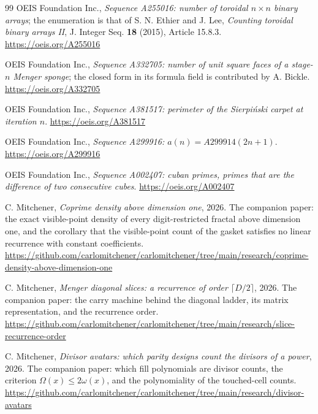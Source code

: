 \documentclass[11pt]{amsart}
\theoremstyle{definition}
\theoremstyle{remark}
\begin{document}
\begin{thebibliography}{99}
OEIS Foundation Inc., \emph{Sequence A255016: number of toroidal $n \times n$ binary arrays}; the enumeration is that of S. N. Ethier and J. Lee, \emph{Counting toroidal binary arrays II}, J. Integer Seq. \textbf{18} (2015), Article 15.8.3. \url{https://oeis.org/A255016}

OEIS Foundation Inc., \emph{Sequence A332705: number of unit square faces of a stage-$n$ Menger sponge}; the closed form in its formula field is contributed by A. Bickle. \url{https://oeis.org/A332705}

OEIS Foundation Inc., \emph{Sequence A381517: perimeter of the Sierpi\'nski carpet at iteration $n$}. \url{https://oeis.org/A381517}

OEIS Foundation Inc., \emph{Sequence A299916: $a(n) = A299914(2n+1)$}. \url{https://oeis.org/A299916}

OEIS Foundation Inc., \emph{Sequence A002407: cuban primes, primes that are the difference of two consecutive cubes}. \url{https://oeis.org/A002407}

C. Mitchener, \emph{Coprime density above dimension one}, 2026. The companion paper: the exact visible-point density of every digit-restricted fractal above dimension one, and the corollary that the visible-point count of the gasket satisfies no linear recurrence with constant coefficients. \url{https://github.com/carlomitchener/carlomitchener/tree/main/research/coprime-density-above-dimension-one}

C. Mitchener, \emph{Menger diagonal slices: a recurrence of order $\lceil D/2 \rceil$}, 2026. The companion paper: the carry machine behind the diagonal ladder, its matrix representation, and the recurrence order. \url{https://github.com/carlomitchener/carlomitchener/tree/main/research/slice-recurrence-order}

C. Mitchener, \emph{Divisor avatars: which parity designs count the divisors of a power}, 2026. The companion paper: which fill polynomials are divisor counts, the criterion $\Omega(x) \le 2\omega(x)$, and the polynomiality of the touched-cell counts. \url{https://github.com/carlomitchener/carlomitchener/tree/main/research/divisor-avatars}

\end{thebibliography}
\end{document}

